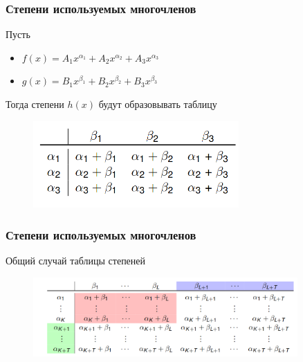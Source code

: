 \documentclass{beamer}
\begin{document}
\begin{frame}
    \frametitle{Степени используемых многочленов}
    Пусть
    \begin{itemize}
        \item $f(x) = A_1x^{\alpha_1} + A_2x^{\alpha_2} + A_3x^{\alpha_3}$
        \item $g(x) = B_1x^{\beta_1} + B_2x^{\beta_2} + B_3x^{\beta_3}$
    \end{itemize}
    Тогда степени $h(x)$ будут образовывать таблицу
    \begin{figure}[h!]
        \centering
        \includegraphics[width=0.7\textwidth]{deg_table.png}
    \end{figure}
\end{frame}

\begin{frame}
    \frametitle{Степени используемых многочленов}
    Общий случай таблицы степеней
    \begin{figure}[h!]
        \includegraphics[width=0.9\textwidth]{deg_table_gen.png}
    \end{figure}
\end{frame}
\end{document}
